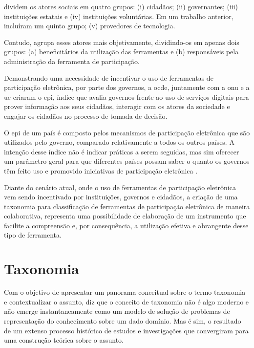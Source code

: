 \par
{} dividem os atores sociais em quatro grupos: (i) cidadãos; (ii) governantes; (iii) instituições estatais e (iv) instituições voluntárias.
Em um trabalho anterior,  incluíram um quinto grupo; (v) provedores de tecnologia.

\par
Contudo,  agrupa esses atores mais objetivamente, dividindo-os em apenas dois grupos: (a) beneficitários da utilização das ferramentas e 
(b) responsáveis pela administração da ferramenta de participação.  

\par
Demonstrando uma necessidade de incentivar o uso de ferramentas de participação eletrônica, por parte dos governos,  a \acrfull{ocde}, juntamente com a \acrshort{onu} 
e a \acrfull{ue} criaram o \acrfull{epi}, índice que avalia governos frente ao uso de serviços digitais para prover informação aos seus cidadãos, interagir com os atores da 
sociedade e engajar os cidadãos no processo de tomada de decisão. 

\par 
O \acrshort{epi} de um país é composto pelos mecanismos de participação eletrônica que são utilizados pelo governo, comparado relativamente a todos os outros países.
A intenção desse índice não é indicar práticas a serem seguidas, mas sim oferecer um parâmetro geral para que diferentes países possam saber o quanto os governos têm 
feito uso e promovido iniciativas de participação eletrônica \cite{onu2018} .

\par
Diante do cenário atual, onde o uso de ferramentas de participação eletrônica vem sendo incentivado por instituições, governos e cidadãos, a criação de uma taxonomia para 
classificação de ferramentas de participação eletrônica de maneira colaborativa, representa uma possibilidade de elaboração de um instrumento que facilite a compreensão e, 
por consequência, a utilização efetiva e abrangente desse tipo de ferramenta.

\section{Taxonomia}
\label{sec:taxonomia}
Com o objetivo de apresentar um panorama conceitual sobre o termo taxonomia e contextualizar o assunto,  diz que o conceito de taxonomia
não é algo moderno e não emerge instantaneamente como um modelo de solução de problemas de representação do conhecimento sobre um dado domínio. Mas é sim,
o resultado de um extenso processo histórico de estudos e investigações que convergiram para uma construção teórica sobre o assunto. 

